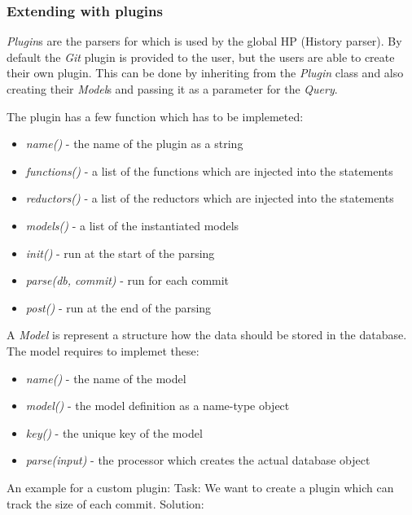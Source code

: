 \subsubsection{Extending with plugins}

\textit{Plugin}s are the parsers for which is used by the global HP (History parser). 
By default the \textit{Git} plugin is provided to the user, but the users are able to create their own plugin.
\newline
This can be done by inheriting from the \textit{Plugin} class and also creating their \textit{Model}s and passing it as a parameter for the \textit{Query}.

The plugin has a few function which has to be implemeted:
\begin{itemize}
	\item \textit{name()} - the name of the plugin as a string
	\item \textit{functions()} - a list of the functions which are injected into the statements
	\item \textit{reductors()} - a list of the reductors which are injected into the statements
	\item \textit{models()} - a list of the instantiated models
 
	\item \textit{init()} - run at the start of the parsing
	\item \textit{parse(db, commit)} - run for each commit
	\item \textit{post()} - run at the end of the parsing
\end{itemize}

A \textit{Model} is represent a structure how the data should be stored in the database.
The model requires to implemet these:
\begin{itemize}
	\item \textit{name()} - the name of the model
	\item \textit{model()} - the model definition as a name-type object 
	\item \textit{key()} - the unique key of the model
	\item \textit{parse(input)} - the processor which creates the actual database object
\end{itemize}

An example for a custom plugin:\newline
Task: We want to create a plugin which can track the size of each commit. 
Solution:\newline

